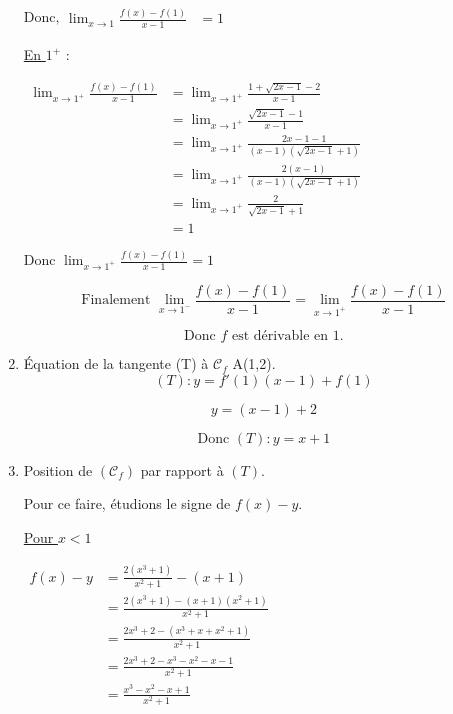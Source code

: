 \documentclass[12pt,a4paper]{article}
\begin{document}
\begin{enumerate}
          \( \text{Donc,}
          \begin{aligned}
              \lim_{x \to 1} \frac{f(x) - f(1)}{x - 1} & = 1
          \end{aligned}
          \)

          \underline{En \( 1^+ \)} :

          \(
          \begin{aligned}
              \lim_{x \to 1^+} \frac{f(x) - f(1)}{x - 1} & = \lim_{x \to 1^+} \frac{1 + \sqrt{2x - 1} - 2}{x - 1}           \\
                                                         & = \lim_{x \to 1^+} \frac{\sqrt{2x - 1} - 1}{x - 1}               \\
                                                         & = \lim_{x \to 1^+} \frac{2x - 1 - 1}{(x - 1)(\sqrt{2x - 1} + 1)} \\
                                                         & = \lim_{x \to 1^+} \frac{2(x - 1)}{(x - 1)(\sqrt{2x - 1} + 1)}   \\
                                                         & = \lim_{x \to 1^+} \frac{2}{\sqrt{2x - 1} + 1}                   \\
                                                         & = 1
          \end{aligned}
          \)

          \( \text{Donc } \lim_{x \to 1^+} \frac{f(x) - f(1)}{x - 1} = 1 \)

          \[
              \text{Finalement } \lim_{x \to 1^-} \frac{f(x) - f(1)}{x - 1} = \lim_{x \to 1^+} \frac{f(x) - f(1)}{x - 1}
          \]

          \[
              \text{Donc } f \text{ est dérivable en } 1.
          \]
    \item Équation de la tangente  (T) à \( \mathcal{C}_{f} \)  A(1,2).
          \[
              (T) : y = f'(1)(x - 1) + f(1)
          \]

          \[
              y = (x - 1) + 2
          \]

          \[
              \text{Donc } (T) : y = x + 1
          \]
    \item Position de \( (\mathcal{C}_f) \) par rapport à \( (T) \).

          Pour ce faire, étudions le signe de \( f(x) - y \).

          \underline{Pour \( x < 1 \)}

          \(
          \begin{aligned}
              f(x) - y & = \frac{2(x^3 + 1)}{x^2 + 1} - (x + 1)           \\
                       & = \frac{2(x^3 + 1) - (x + 1)(x^2 + 1)}{x^2 + 1}  \\
                       & = \frac{2x^3 + 2 - (x^3 + x + x^2 + 1)}{x^2 + 1} \\
                       & = \frac{2x^3 + 2 - x^3 - x^2 - x - 1}{x^2 + 1}   \\
                       & = \frac{x^3 - x^2 - x + 1}{x^2 + 1}
          \end{aligned}
          \)


\end{enumerate}
\end{document}
